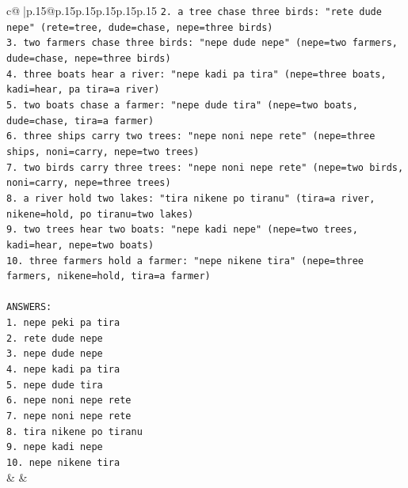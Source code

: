 \documentclass{article}
\begin{document}
{\begin{supertabular}{c@{$\;$}|p{.15\linewidth}@{}p{.15\linewidth}p{.15\linewidth}p{.15\linewidth}p{.15\linewidth}p{.15\linewidth}}
{{{\texttt{2. a tree chase three birds: "rete dude nepe" (rete=tree, dude=chase, nepe=three birds)} \\
\texttt{3. two farmers chase three birds: "nepe dude nepe" (nepe=two farmers, dude=chase, nepe=three birds)} \\
\texttt{4. three boats hear a river: "nepe kadi pa tira" (nepe=three boats, kadi=hear, pa tira=a river)} \\
\texttt{5. two boats chase a farmer: "nepe dude tira" (nepe=two boats, dude=chase, tira=a farmer)} \\
\texttt{6. three ships carry two trees: "nepe noni nepe rete" (nepe=three ships, noni=carry, nepe=two trees)} \\
\texttt{7. two birds carry three trees: "nepe noni nepe rete" (nepe=two birds, noni=carry, nepe=three trees)} \\
\texttt{8. a river hold two lakes: "tira nikene po tiranu" (tira=a river, nikene=hold, po tiranu=two lakes)} \\
\texttt{9. two trees hear two boats: "nepe kadi nepe" (nepe=two trees, kadi=hear, nepe=two boats)} \\
\texttt{10. three farmers hold a farmer: "nepe nikene tira" (nepe=three farmers, nikene=hold, tira=a farmer)} \\
\\ 
\texttt{ANSWERS:} \\
\texttt{1. nepe peki pa tira} \\
\texttt{2. rete dude nepe} \\
\texttt{3. nepe dude nepe} \\
\texttt{4. nepe kadi pa tira} \\
\texttt{5. nepe dude tira} \\
\texttt{6. nepe noni nepe rete} \\
\texttt{7. nepe noni nepe rete} \\
\texttt{8. tira nikene po tiranu} \\
\texttt{9. nepe kadi nepe} \\
\texttt{10. nepe nikene tira} \\
            }
        }
    }
    & & \\ \\


\end{supertabular}}
\end{document}
